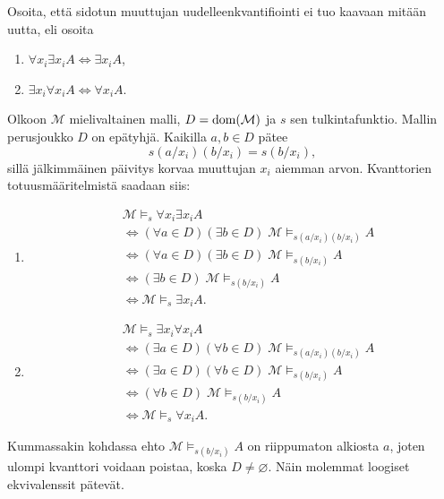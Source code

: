 \documentclass[11pt,a4paper]{amsart}
\begin{document}
\begin{exercise}
  Osoita, että sidotun muuttujan uudelleenkvantifiointi ei tuo kaavaan mitään
  uutta, eli osoita
  \begin{enumerate}[label=(\alph*)]
    \item \(\forall x_i\exists x_iA \Leftrightarrow \exists x_iA\),
    \item \(\exists x_i\forall x_iA \Leftrightarrow \forall x_iA\).
  \end{enumerate}
\end{exercise}

\begin{solution}
  Olkoon \(\mathcal M\) mielivaltainen malli, \(D = \operatorname{dom}(\mathcal M)\)
  ja \(s\) sen tulkintafunktio. Mallin perusjoukko \(D\) on epätyhjä.
  Kaikilla \(a,b \in D\) pätee
  \[
    s(a/x_i)(b/x_i) = s(b/x_i),
  \]
  sillä jälkimmäinen päivitys korvaa muuttujan \(x_i\) aiemman arvon.
  Kvanttorien totuusmääritelmistä saadaan siis:
  \begin{enumerate}[label=(\alph*)]
    \item
      \[
        \begin{aligned}
          &\mathcal M \models_s \forall x_i\exists x_iA \\
          &\iff (\forall a \in D)(\exists b \in D)\;
          \mathcal M \models_{s(a/x_i)(b/x_i)} A \\
          &\iff (\forall a \in D)(\exists b \in D)\;
          \mathcal M \models_{s(b/x_i)} A \\
          &\iff (\exists b \in D)\;
          \mathcal M \models_{s(b/x_i)} A \\
          &\iff \mathcal M \models_s \exists x_iA.
        \end{aligned}
      \]

    \item
      \[
        \begin{aligned}
          &\mathcal M \models_s \exists x_i\forall x_iA \\
          &\iff (\exists a \in D)(\forall b \in D)\;
          \mathcal M \models_{s(a/x_i)(b/x_i)} A \\
          &\iff (\exists a \in D)(\forall b \in D)\;
          \mathcal M \models_{s(b/x_i)} A \\
          &\iff (\forall b \in D)\;
          \mathcal M \models_{s(b/x_i)} A \\
          &\iff \mathcal M \models_s \forall x_iA.
        \end{aligned}
      \]
  \end{enumerate}
  Kummassakin kohdassa ehto \(\mathcal M \models_{s(b/x_i)} A\) on
  riippumaton alkiosta \(a\), joten ulompi kvanttori voidaan poistaa,
  koska \(D \ne \varnothing\). Näin molemmat loogiset ekvivalenssit
  pätevät.\qedhere
\end{solution}
\end{document}
